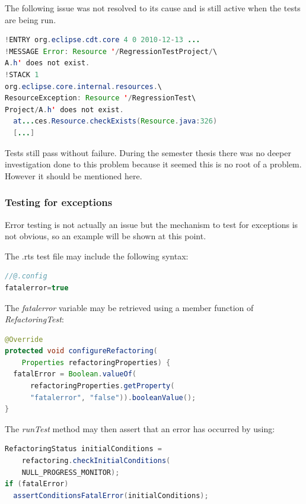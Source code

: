 The following issue was not resolved to its cause and is still active when the 
tests are being run.

\begin{lstlisting}[caption={Randomly appearing error message},language=java]
!ENTRY org.eclipse.cdt.core 4 0 2010-12-13 ...
!MESSAGE Error: Resource '/RegressionTestProject/\
A.h' does not exist.
!STACK 1
org.eclipse.core.internal.resources.\
ResourceException: Resource '/RegressionTest\
Project/A.h' does not exist.
  at...ces.Resource.checkExists(Resource.java:326)
  [...]
\end{lstlisting}

Tests still pass without failure. During the semester thesis there was no deeper
investigation done to this problem because it seemed this is no root of a
problem. However it should be mentioned here.

\subsubsection{Testing for exceptions}

Error testing is not actually an issue but the mechanism to test for exceptions 
is not obvious, so an example will be shown at this point. 

The .rts test file may include the following syntax:

\begin{lstlisting}[caption={Syntax to set variables inside a .rts file},
language=java]
//@.config
fatalerror=true
\end{lstlisting}

The \textit{fatalerror} variable may be retrieved using a member function of \textit{RefactoringTest}:
\begin{lstlisting}[caption={Accessing a property set in the .rts file},
language=java]
@Override
protected void configureRefactoring(
    Properties refactoringProperties) {
  fatalError = Boolean.valueOf(
      refactoringProperties.getProperty(
      "fatalerror", "false")).booleanValue();
}
\end{lstlisting}

The \textit{runTest} method may then assert that an error has occurred by using:
\begin{lstlisting}[caption={Checking for errors inside the refactoring test class},language=java]
RefactoringStatus initialConditions = 
    refactoring.checkInitialConditions(
    NULL_PROGRESS_MONITOR);
if (fatalError)
  assertConditionsFatalError(initialConditions);
\end{lstlisting}

